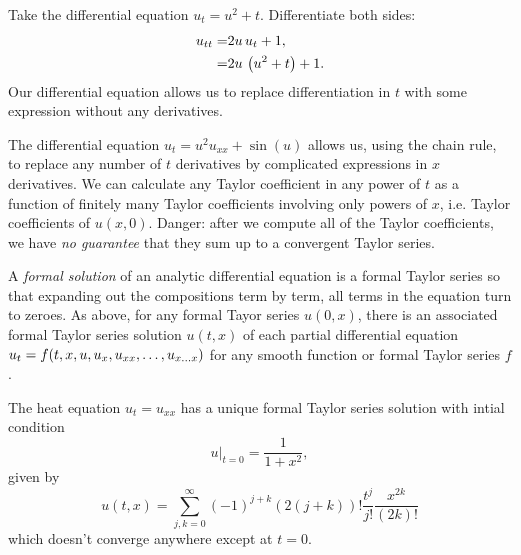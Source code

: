 \begin{example}
Take the differential equation \(u_t=u^2+t\).
Differentiate both sides:
\begin{align*}
u_{tt}
=&
2u \, u_t + 1, \\
=&
2u \, \left(u^2+t\right) + 1.
\end{align*}
Our differential equation allows us to replace differentiation in \(t\) with some expression without any derivatives.
\end{example}
\begin{example}
The differential equation \(u_t = u^2 u_{xx} + \sin(u)\) allows us, using the chain rule, to replace any number of \(t\) derivatives by complicated expressions in \(x\) derivatives.
We can calculate any Taylor coefficient in any power of \(t\) as a function of finitely many Taylor coefficients involving only powers of \(x\), i.e. Taylor coefficients of \(u(x,0)\).
Danger: after we compute all of the Taylor coefficients, we have \emph{no guarantee} that they sum up to a convergent Taylor series.
\end{example}

A \emph{formal solution} of an analytic differential equation is a formal Taylor series so that expanding out the compositions term by term, all terms in the equation turn to zeroes.
As above, for any formal Tayor series \(u(0,x)\), there is an associated formal Taylor series solution \(u(t,x)\) of each partial differential equation \(u_t = f\!\left(t,x,u,u_x,u_{xx},\dots,u_{x\dots x}\right)\) for any smooth function or formal Taylor series \(f\).

\begin{example}
The heat equation \(u_t=u_{xx}\) has a unique formal Taylor series solution with intial condition
\[
 \left.u\right|_{t=0}= \frac{1}{1+x^2},
\]
given by
\[
 u(t,x)=\sum_{j,k=0}^{\infty} (-1)^{j+k}(2(j+k))! \frac{t^j}{j!} \frac{x^{2k}}{(2k)!}
\]
which doesn't converge anywhere except at \(t=0\).
\end{example}


